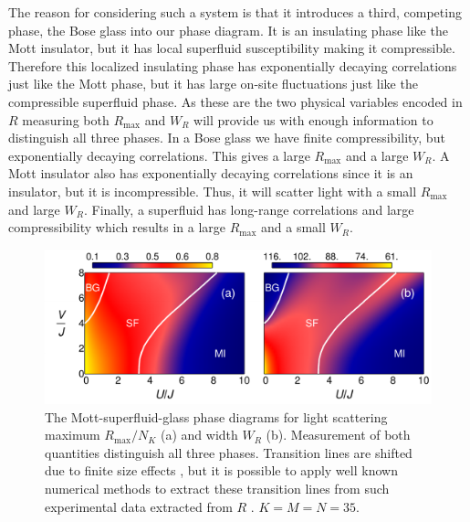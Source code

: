 The reason for considering such a system is that it introduces a
third, competing phase, the Bose glass into our phase diagram. It is
an insulating phase like the Mott insulator, but it has local
superfluid susceptibility making it compressible. Therefore this
localized insulating phase has exponentially decaying correlations
just like the Mott phase, but it has large on-site fluctuations just
like the compressible superfluid phase. As these are the two physical
variables encoded in $R$ measuring both $R_\text{max}$ and $W_R$ will
provide us with enough information to distinguish all three phases. In
a Bose glass we have finite compressibility, but exponentially
decaying correlations. This gives a large $R_\text{max}$ and a large
$W_R$. A Mott insulator also has exponentially decaying correlations
since it is an insulator, but it is incompressible. Thus, it will
scatter light with a small $R_\text{max}$ and large $W_R$. Finally, a
superfluid has long-range correlations and large compressibility which
results in a large $R_\text{max}$ and a small $W_R$.

\begin{figure}  
  \centering
  \includegraphics[width=\linewidth]{oph22_3}
  \caption[Mapping the Disordered Phase Diagram]{The
    Mott-superfluid-glass phase diagrams for light scattering maximum
    $R_\text{max}/N_K$ (a) and width $W_R$ (b). Measurement of both
    quantities distinguish all three phases. Transition lines are
    shifted due to finite size effects \cite{roux2008}, but it is
    possible to apply well known numerical methods to extract these
    transition lines from such experimental data extracted from $R$
    \cite{ejima2011}. $K=M=N=35$.}
  \label{fig:BG}
\end{figure}


